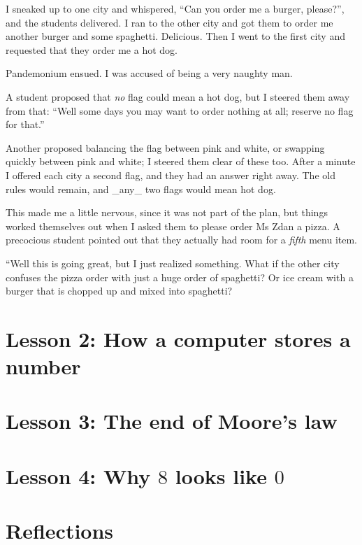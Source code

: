 \documentclass[sigplan,review]{acmart}
\begin{document}

I sneaked up to one city and whispered, ``Can you order me a burger, please?'', and the students delivered.
I ran to the other city and got them to order me another burger and some spaghetti. Delicious.
Then I went to the first city and requested that they order me a hot dog.

Pandemonium ensued.
I was accused of being a very naughty man.

A student proposed that \emph{no} flag could mean a hot dog, but I steered them away from that: ``Well some days you may want to order nothing at all; reserve no flag for that.''

Another proposed balancing the flag between pink and white, or swapping quickly between pink and white; I steered them clear of these too.
After a minute I offered each city a second flag, and they had an answer right away.
The old rules would remain, and _any_ two flags would mean hot dog.


This made me a little nervous, since it was not part of the plan, but things worked themselves out when I asked them to please order Ms Zdan a pizza.
A precocious student pointed out that they actually had room for a \emph{fifth} menu item.


``Well this is going great, but I just realized something.
What if the other city confuses the pizza order with just a huge order of spaghetti?
Or ice cream with a burger that is chopped up and mixed into spaghetti?

\section*{Lesson 2: How a computer stores a number}

\section*{Lesson 3: The end of Moore's law}

\section*{Lesson 4: Why $8$ looks like $0$}

\section*{Reflections}
\end{document}
